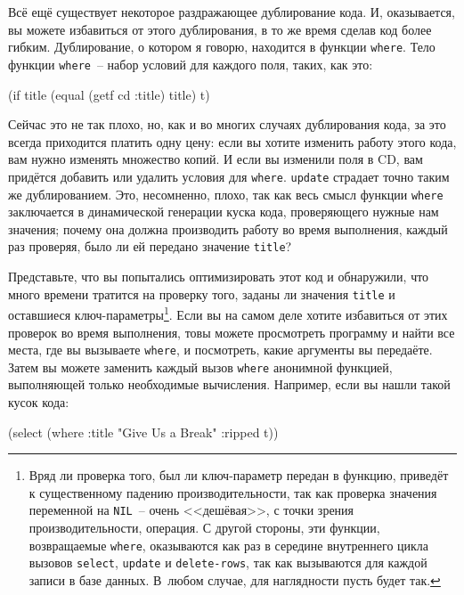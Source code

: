 Всё ещё существует некоторое раздражающее дублирование кода. И, оказывается, вы можете
избавиться от этого дублирования, в то же время сделав код более гибким. Дублирование, о
котором я говорю, находится в функции \lstinline{where}. Тело функции \lstinline{where}~-- набор
условий для каждого поля, таких, как это:

\begin{myverb}
(if title (equal (getf cd :title) title) t)
\end{myverb}

Сейчас это не так плохо, но, как и во многих случаях дублирования кода, за это всегда
приходится платить одну цену: если вы хотите изменить работу этого кода, вам нужно
изменять множество копий. И если вы изменили поля в CD, вам придётся добавить или удалить
условия для \lstinline{where}. \lstinline{update} страдает точно таким же дублированием. Это,
несомненно, плохо, так как весь смысл функции \lstinline{where} заключается в динамической
генерации куска кода, проверяющего нужные нам значения; почему она должна производить
работу во время выполнения, каждый раз проверяя, было ли ей передано значение
\lstinline{title}?

Представьте, что вы попытались оптимизировать этот код и обнаружили, что много времени
тратится на проверку того, заданы ли значения \lstinline{title} и оставшиеся
ключ-параметры\footnote{Вряд ли проверка того, был ли ключ-параметр передан в функцию,
  приведёт к существенному падению производительности, так как проверка значения
  переменной на \lstinline{NIL}~-- очень <<дешёвая>>, с точки зрения производительности, операция. С
  другой стороны, эти функции, возвращаемые \lstinline{where}, оказываются как раз в середине
  внутреннего цикла вызовов \lstinline{select}, \lstinline{update} и \lstinline{delete-rows}, так как
  вызываются для каждой записи в базе данных. В~любом случае, для наглядности пусть будет
  так.}\hspace{\footnotenegspace}. Если вы на самом деле хотите избавиться от этих проверок во время выполнения, товы
можете просмотреть программу и найти все места, где вы вызываете \lstinline{where}, и
посмотреть, какие аргументы вы передаёте. Затем вы можете заменить каждый вызов
\lstinline{where} анонимной функцией, выполняющей только необходимые вычисления. Например, если
вы нашли такой кусок кода:

\begin{myverb}
(select (where :title "Give Us a Break" :ripped t))
\end{myverb}

